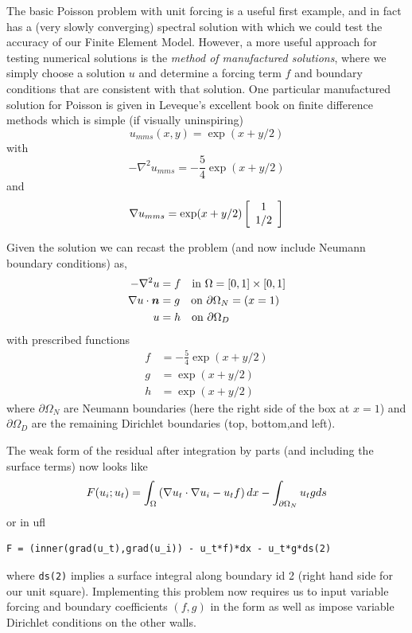 The basic Poisson problem with unit forcing is a useful first example,
and in fact has a (very slowly converging) spectral solution with
which we could test the accuracy of our Finite Element Model.
However, a more useful approach for testing numerical solutions is the
\emph{method of manufactured solutions}, where we simply choose a
solution $u$ and determine a forcing term $f$ and boundary conditions
that are consistent with that solution.  One particular manufactured
solution for Poisson is given in Leveque's excellent book on finite
difference methods \cite{leveque_finite_2007} which is simple (if
visually uninspiring)
\begin{equation}
  \label{eq:13}
  u_{mms}(x,y) = \exp(x + y/2)
\end{equation}
with
\begin{equation}
  \label{eq:14}
  -\nabla^{2} u_{mms} = -\frac{5}{4}\exp(x+y/2)
\end{equation}
and
\begin{equation}
  \label{eq:15}
  \nabla u_{mms} = \exp(x+y/2)
  \left[
    \begin{array}{c}
 1 \\
1/2\\
\end{array}
  \right]
\end{equation}

Given the solution we can recast the problem (and now include  Neumann boundary conditions) as,
\begin{align}
  \label{eq:16}
-\nabla^2u &= f \quad\text{in } \Omega=[0,1]\times[0,1] \nonumber\\
\nabla u\cdot{\mbox{\boldmath$n$}} & = g \quad\text{on } \partial\Omega_{N}=(x=1)\\
 u &= h \quad\text{on } \partial\Omega_{D}\nonumber
\end{align}
with  prescribed functions
\begin{align}
  \label{eq:17}
  f &= -\frac{5}{4}\exp(x+y/2)\nonumber\\
  g & = \exp(x+y/2)\\
  h &=  \exp(x+y/2)\nonumber
\end{align}
where $\partial\Omega_{N}$ are Neumann boundaries (here the right side
of the box at $x=1$) and $\partial\Omega_{D}$ are the remaining Dirichlet boundaries (top, bottom,and left).

The weak form of the residual after integration by parts (and
including the surface terms) now looks like
\begin{equation}
  F(u_{i};u_{t}) = \int_{\Omega}
  \left(
    \nabla u_{t}\cdot\nabla u_{i} - u_{t}f
  \right)dx - \int_{\partial\Omega_{N}} u_{t}g ds
\end{equation}
or in ufl
\begin{lstlisting}[style=ufl]
F = (inner(grad(u_t),grad(u_i)) - u_t*f)*dx - u_t*g*ds(2)
\end{lstlisting}
where \texttt{ds(2)} implies a surface integral along boundary id 2
(right hand side for our unit square). Implementing this problem now
requires us to input variable forcing and boundary coefficients
$(f,g)$ in the form as well as impose variable Dirichlet conditions on
the other walls.

